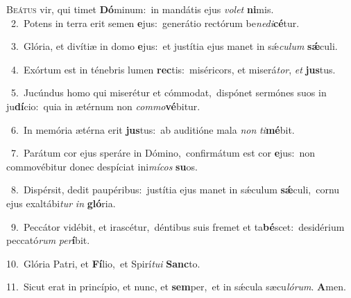 \lettrine{\initial\textcolor{\initialcolor}{B}}{eátus} vir, qui timet \textbf{Dó}\-minum:~\star in mandátis ejus \textit{vo}\-\textit{let} \textbf{ni}\-mis.\\
{\numbfont\textcolor{\numbcolor}{~2.}}~Potens in terra erit semen \textbf{e}\-jus:~\star generátio rectórum be\-\textit{ne}\-\textit{di}\textbf{cé}tur.\par
{\numbfont\textcolor{\numbcolor}{~3.}}~Glória, et divítiæ in domo \textbf{e}\-jus:~\star et justítia ejus manet in sǽ\-\textit{cu}\-\textit{lum} \textbf{sǽ}\-culi.\par
{\numbfont\textcolor{\numbcolor}{~4.}}~Exórtum est in ténebris lumen \textbf{rec}\-tis:~\star miséricors, et miserá\-\textit{tor}\-, \textit{et} \textbf{jus}\-tus.\par
{\numbfont\textcolor{\numbcolor}{~5.}}~Jucúndus homo qui miserétur et cómmodat,~\dagger dispónet sermónes suos in ju\-\textbf{dí}\-cio:~\star quia in ætérnum non \textit{com}\-\textit{mo}\textbf{vé}bitur.\par
{\numbfont\textcolor{\numbcolor}{~6.}}~In memória ætérna erit \textbf{jus}\-tus:~\star ab auditióne mala \textit{non} \textit{ti}\-\textbf{mé}bit.\par
{\numbfont\textcolor{\numbcolor}{~7.}}~Parátum cor ejus speráre in Dómino,~\dagger confirmátum est cor \textbf{e}\-jus:~\star non commovébitur donec despíciat ini\-\textit{mí}\-\textit{cos} \textbf{su}\-os.\par
{\numbfont\textcolor{\numbcolor}{~8.}}~Dispérsit, dedit paupéribus:~\dagger justítia ejus manet in sǽculum \textbf{sǽ}\-culi,~\star cornu ejus exaltábi\textit{tur} \textit{in} \textbf{gló}\-ria.\par
{\numbfont\textcolor{\numbcolor}{~9.}}~Peccátor vidébit, et irascétur,~\dagger déntibus suis fremet et ta\-\textbf{bé}\-scet:~\star desidérium peccató\textit{rum} \textit{per}\-\textbf{í}bit.\par
{\numbfont\textcolor{\numbcolor}{10.}}~Glória Patri, et \textbf{Fí}\-lio,~\star et Spirí\-\textit{tu}\-\textit{i} \textbf{Sanc}\-to.\par
{\numbfont\textcolor{\numbcolor}{11.}}~Sicut erat in princípio, et nunc, et \textbf{sem}\-per,~\star et in sǽcula sæcu\-\textit{ló}\-\textit{rum}. \textbf{A}\-men.\par
